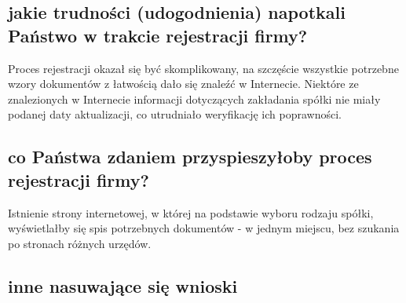 \documentclass[a4paper, 11pt]{article}
\begin{document}
\subsection{jakie trudności (udogodnienia) napotkali Państwo w trakcie rejestracji firmy?}
Proces rejestracji okazał się być skomplikowany, na szczęście wszystkie potrzebne wzory dokumentów z łatwością dało się znaleźć w Internecie. Niektóre ze znalezionych w Internecie informacji dotyczących zakładania spółki nie miały podanej daty aktualizacji, co utrudniało weryfikację ich poprawności.
\subsection{co Państwa zdaniem przyspieszyłoby proces rejestracji firmy?}
Istnienie strony internetowej, w której na podstawie wyboru rodzaju spółki, wyświetlałby się spis potrzebnych dokumentów - w jednym miejscu, bez szukania po stronach różnych urzędów. 
\subsection{inne nasuwające się wnioski}
\end{document}
